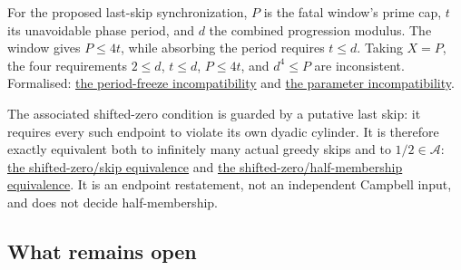 \documentclass[11pt]{article}
\newcommand{\commit}{99f4bf47422abbd8757cbb22b50ba079d764d3a7}
\newcommand{\repobase}{https://github.com/wcook04/plectis-erdos/blob/\commit}
\newcommand{\PK}{Erdos249257}
\newcommand{\lword}[4]{\href{\repobase/\PK/#1\#L#2}{#4}}
\theoremstyle{definition}
\theoremstyle{remark}
\begin{document}
{For the proposed last-skip synchronization, \(P\) is the fatal window's
prime cap, \(t\) its unavoidable phase period, and \(d\) the combined
progression modulus.  The window gives \(P\le4t\), while absorbing the
period requires \(t\le d\).  Taking \(X=P\), the four requirements
\(2\le d\), \(t\le d\), \(P\le4t\), and \(d^4\le P\) are inconsistent.
Formalised:
\lword{CampbellShiftSynchronization.lean}{299}{campbellQuarterExponent_periodFreeze_noSync}{the period-freeze incompatibility}
and
\lword{CampbellShiftSynchronization.lean}{320}{campbellPhaseFreeze_parameters_impossible}{the parameter incompatibility}.

The associated shifted-zero condition is guarded by a putative last skip: it
requires every such endpoint to violate its own dyadic cylinder.  It is
therefore exactly equivalent both to infinitely many actual greedy skips and
to $1/2\in\mathcal A$:
\lword{CampbellShiftSynchronization.lean}{471}{shiftWindowZero_iff_greedyMersenneSkippedSupport_infinite}{the shifted-zero/skip equivalence}
and
\lword{CampbellShiftSynchronization.lean}{488}{shiftWindowZero_iff_half_mem_mersenneAchievementSet}{the shifted-zero/half-membership equivalence}.
It is an endpoint restatement, not an independent Campbell input, and does
not decide half-membership.

}

\subsection{What remains open}
\end{document}

